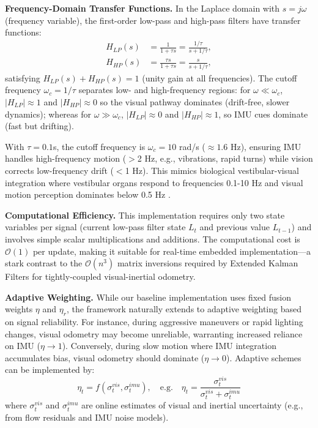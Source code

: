 \textbf{Frequency-Domain Transfer Functions.} In the Laplace domain with $s = j\omega$ (frequency variable), the first-order low-pass and high-pass filters have transfer functions:
\begin{align}
    H_{LP}(s) & = \frac{1}{1 + \tau s} = \frac{1/\tau}{s + 1/\tau}, \label{eq:h_lp} \\
    H_{HP}(s) & = \frac{\tau s}{1 + \tau s} = \frac{s}{s + 1/\tau}, \label{eq:h_hp}
\end{align}
satisfying $H_{LP}(s) + H_{HP}(s) = 1$ (unity gain at all frequencies). The cutoff frequency $\omega_c = 1/\tau$ separates low- and high-frequency regions: for $\omega \ll \omega_c$, $|H_{LP}| \approx 1$ and $|H_{HP}| \approx 0$ so the visual pathway dominates (drift-free, slower dynamics); whereas for $\omega \gg \omega_c$, $|H_{LP}| \approx 0$ and $|H_{HP}| \approx 1$, so IMU cues dominate (fast but drifting).

With $\tau = 0.1$s, the cutoff frequency is $\omega_c = 10$ rad/s ($\approx 1.6$ Hz), ensuring IMU handles high-frequency motion ($>$2 Hz, e.g., vibrations, rapid turns) while vision corrects low-frequency drift ($<$1 Hz). This mimics biological ves\-tib\-u\-lar-visual integration where ves\-tib\-u\-lar organs respond to frequencies 0.1-10 Hz and visual motion perception dominates below 0.5 Hz \cite{Angelaki2004}.

\textbf{Computational Efficiency.} This implementation requires only two state variables per signal (current low-pass filter state $L_t$ and previous value $L_{t-1}$) and involves simple scalar multiplications and additions. The computational cost is $\mathcal{O}(1)$ per update, making it suitable for real-time embedded implementation---a stark contrast to the $\mathcal{O}(n^3)$ matrix inversions required by Extended Kalman Filters for tightly-coupled visual-inertial odometry.

\textbf{Adaptive Weighting.} While our baseline implementation uses fixed fusion weights $\eta$ and $\eta_r$, the framework naturally extends to adaptive weighting based on signal reliability. For instance, during aggressive maneuvers or rapid lighting changes, visual odometry may become unreliable, warranting increased reliance on IMU ($\eta \to 1$). Conversely, during slow motion where IMU integration accumulates bias, visual odometry should dominate ($\eta \to 0$). Adaptive schemes can be implemented by:
\begin{equation}
    \eta_t = f(\sigma^{vis}_t, \sigma^{imu}_t),\quad \text{e.g.} \quad \eta_t = \frac{\sigma^{vis}_t}{\sigma^{vis}_t + \sigma^{imu}_t}
\end{equation}
where $\sigma^{vis}_t$ and $\sigma^{imu}_t$ are online estimates of visual and inertial uncertainty (e.g., from flow residuals and IMU noise models).

